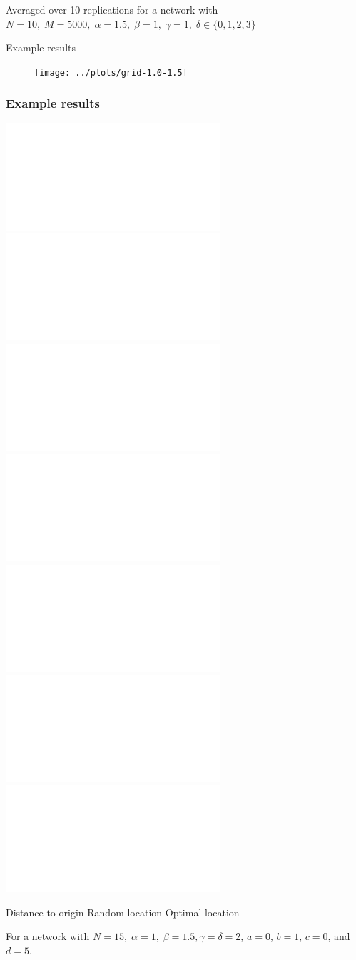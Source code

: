 \documentclass[11pt]{beamer}
\begin{document}
\begin{frame}
\begin{center}
%

\vspace*{-.2cm}

%
%
%
%

\vspace*{.2cm}

Averaged over 10 replications for a network with $N = 10, \; M = 5000, \; \alpha = 1.5, \; \beta = 1, \; \gamma = 1, \; \delta \in \{0,1,2,3\}$
\end{center}
\end{frame}

\begin{frame}{Example results}

	\begin{figure}
		\centering
		\texttt{[image: ../plots/grid-1.0-1.5]}
	\end{figure}

\end{frame}

\begin{frame}
\frametitle{Example results}
\centering
{}%
%
%

\includegraphics<1->[width=.3\textwidth]{../plots/distance-1_0-1_5-1-1.pdf}
\includegraphics<1>[width=.3\textwidth]{../plots/individual-1_0-1_5-1-1.pdf}
\includegraphics<2>[width=.3\textwidth]{../plots/individual-1_0-1_5-10-1.pdf}
\includegraphics<3>[width=.3\textwidth]{../plots/individual-1_0-1_5-100-1.pdf}
\includegraphics<1>[width=.3\textwidth]{../plots/optimal-1_0-1_5-1-1.pdf}
\includegraphics<2>[width=.3\textwidth]{../plots/optimal-1_0-1_5-10-1.pdf}
\includegraphics<3>[width=.3\textwidth]{../plots/optimal-1_0-1_5-100-1.pdf}

Distance to origin \hspace*{.6cm} Random location \hspace*{.6cm} Optimal location

\vspace*{.5cm}

For a network with $N = 15, \; \alpha = 1, \; \beta = 1.5, \gamma = \delta = 2$, $a = 0$, $b = 1$, $c = 0$, and $d = 5$.
\end{frame}
\end{document}

